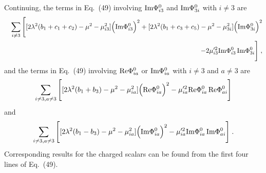 Continuing, the terms in  Eq.~(49) involving ${\rm Im}\Phi^0_{i3}$ and ${\rm Im}\Phi^0_{3i}$ with $i\neq 3$ are
\begin{eqnarray}
 &&\sum_{i\neq 3}\Bigg[[2\lambda^2(b_1+c_1+c_2)-\mu^2-\mu_{i3}^2]\Big({\rm Im}\Phi^0_{i3}\Big)^2+
 [2\lambda^2(b_1+c_3+c_5)-\mu^2-\mu_{3i}^2]\Big({\rm Im}\Phi^0_{3i}\Big)^2\nonumber\\&&~~~
-2\mu'^2_{i3}{\rm Im}\Phi^0_{i3}\,{\rm Im}\Phi^0_{3i}\Bigg]\;,
\end{eqnarray}
and the terms in Eq.~(49) involving ${\rm Re}\Phi^0_{ia}$ or ${\rm Im}\Phi^0_{ia}$ with $i\neq 3$ and $a\neq 3$ are
\begin{equation}
\sum_{i\neq 3,a\neq 3}\Bigg[[2\lambda^2(b_1+b_3)-\mu^2-\mu^2_{ia}]\Big({\rm Re}\Phi_{ia}^0\Big)^2-\mu'^2_{ia}{\rm Re}\Phi^0_{ia}\,{\rm Re}\Phi^0_{ai}\Bigg]
\end{equation}
and 
\begin{equation}
\sum_{i\neq 3,a\neq 3}\Bigg[[2\lambda^2(b_1-b_3)-\mu^2-\mu^2_{ia}]\Big({\rm Im}\Phi_{ia}^0\Big)^2-\mu'^2_{ia}{\rm Im}\Phi^0_{ia}\,{\rm Im}\Phi^0_{ai}\Bigg]\;.
\end{equation}
Corresponding results for the charged scalars can be found from the first four lines of Eq.~(49).

